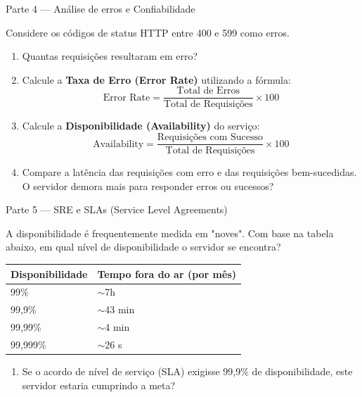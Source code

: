 \documentclass[12pt,a4paper,twoside]{report}
\begin{document}
\begin{block}{Parte 4 — Análise de erros e Confiabilidade}

Considere os códigos de status HTTP entre 400 e 599 como erros.

\begin{enumerate}
\item Quantas requisições resultaram em erro?
\item Calcule a \textbf{Taxa de Erro (Error Rate)} utilizando a fórmula:
\[ \text{Error Rate} = \frac{\text{Total de Erros}}{\text{Total de Requisições}} \times 100 \]
\item Calcule a \textbf{Disponibilidade (Availability)} do serviço:
\[ \text{Availability} = \frac{\text{Requisições com Sucesso}}{\text{Total de Requisições}} \times 100 \]
\item Compare a latência das requisições com erro e das requisições bem-sucedidas. O servidor demora mais para responder erros ou sucessos?
\end{enumerate}

\vspace{1cm}

\end{block}

\begin{block}{Parte 5 — SRE e SLAs (Service Level Agreements)}

A disponibilidade é frequentemente medida em "noves". Com base na tabela abaixo, em qual nível de disponibilidade o servidor se encontra?

\begin{center}
\begin{tabular}{|l|l|}
\hline
\textbf{Disponibilidade} & \textbf{Tempo fora do ar (por mês)} \\ \hline
99\% & $\sim$7h \\ \hline
99,9\% & $\sim$43 min \\ \hline
99,99\% & $\sim$4 min \\ \hline
99,999\% & $\sim$26 s \\ \hline
\end{tabular}
\end{center}

\begin{enumerate}
\item Se o acordo de nível de serviço (SLA) exigisse 99,9\% de disponibilidade, este servidor estaria cumprindo a meta?
\end{enumerate}

\end{block}
\end{document}
